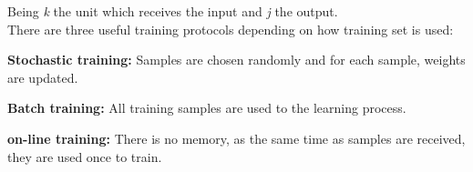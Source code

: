 Being  \textit{k} the unit which receives the input and \textit{j} the output.\\

There are three useful training protocols depending on how training set is used:
\begin{description}[noitemsep,topsep=8pt,parsep=0pt,partopsep=20pt]
	\item \textbf{Stochastic training:} Samples are chosen randomly and for each sample, weights are updated.
	 \item \textbf{Batch training:} All training samples are used to the learning process.
	 \item \textbf{on-line training:} There is no memory, as the same time as samples are received, they are used once to train.
\end{description}


